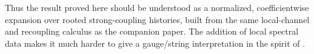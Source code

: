 \documentclass[11pt,a4paper,reqno]{amsart}
\theoremstyle{definition}
\theoremstyle{remark}
\begin{document}
Thus the result proved here should be understood as a normalized, coefficientwise expansion over rooted strong-coupling histories, built from the same local-channel and recoupling calculus as the companion paper. The addition of local spectral data makes it much harder to give a gauge/string interpretation in the spirit of \cite{Cha19,Jaf16}.




\end{document}

